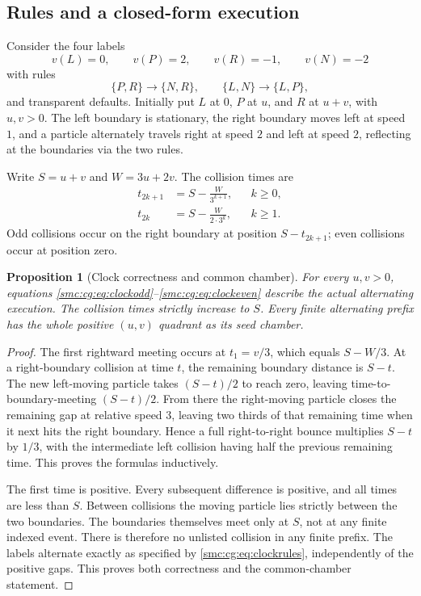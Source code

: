 \documentclass[11pt,letterpaper]{article}
\numberwithin{equation}{section}
\newtheorem{proposition}[theorem]{Proposition}
\theoremstyle{definition}
\theoremstyle{remark}
\begin{document}
\subsection{Rules and a closed-form execution}

Consider the four labels
\[
 v(L)=0,\qquad v(P)=2,\qquad v(R)=-1,\qquad v(N)=-2
\]
with rules
\begin{equation}
 \{P,R\}\longrightarrow\{N,R\},\qquad
 \{L,N\}\longrightarrow\{L,P\},
 \label{smc:cg:eq:clockrules}
\end{equation}
and transparent defaults. Initially put $L$ at $0$, $P$ at $u$, and $R$ at
$u+v$, with $u,v>0$. The left boundary is stationary, the right boundary
moves left at speed $1$, and a particle alternately travels right at speed
$2$ and left at speed $2$, reflecting at the boundaries via the two rules.

Write $S=u+v$ and $W=3u+2v$. The collision times are
\begin{align}
 t_{2k+1}&=S-\frac{W}{3^{k+1}},&&k\ge0,\label{smc:cg:eq:clockodd}\\
 t_{2k}&=S-\frac{W}{2\cdot3^k},&&k\ge1.\label{smc:cg:eq:clockeven}
\end{align}
Odd collisions occur on the right boundary at position $S-t_{2k+1}$;
even collisions occur at position zero.

\begin{proposition}[Clock correctness and common chamber]
\label{smc:cg:prop:clock}
For every $u,v>0$, equations \eqref{smc:cg:eq:clockodd}--\eqref{smc:cg:eq:clockeven}
describe the actual alternating execution. The collision times strictly
increase to $S$. Every finite alternating prefix has the whole positive
$(u,v)$ quadrant as its seed chamber.
\end{proposition}
\begin{proof}
The first rightward meeting occurs at $t_1=v/3$, which equals
$S-W/3$. At a right-boundary collision at time $t$, the remaining boundary
distance is $S-t$. The new left-moving particle takes $(S-t)/2$ to reach
zero, leaving time-to-boundary-meeting $(S-t)/2$. From there the right-moving
particle closes the remaining gap at relative speed $3$, leaving two thirds
of that remaining time when it next hits the right boundary. Hence a full
right-to-right bounce multiplies $S-t$ by $1/3$, with the intermediate
left collision having half the previous remaining time. This proves the
formulas inductively.

The first time is positive. Every subsequent difference is positive, and
all times are less than $S$. Between collisions the moving particle lies
strictly between the two boundaries. The boundaries themselves meet only at
$S$, not at any finite indexed event. There is therefore no unlisted
collision in any finite prefix. The labels alternate exactly as specified
by \eqref{smc:cg:eq:clockrules}, independently of the positive gaps. This proves
both correctness and the common-chamber statement.
\end{proof}
\end{document}
